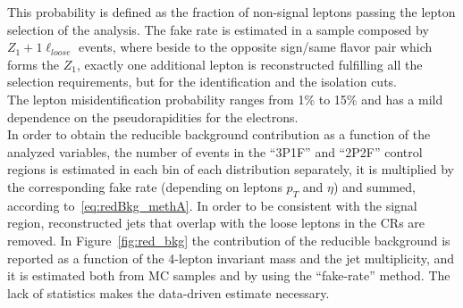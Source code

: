 This probability is defined as the fraction of non-signal leptons passing the lepton selection of the analysis.
The fake rate is estimated in a sample composed by $Z_1 + 1\ell _{loose}$ events, 
where beside to the opposite sign/same flavor pair which forms the $Z_{1}$, 
exactly one additional lepton is reconstructed fulfilling all the selection requirements, 
but for the identification and the isolation cuts.\\
The lepton misidentification probability ranges from 1\% to 15\% and has a mild dependence on the pseudorapidities for the 
electrons.\\
In order to obtain the reducible background contribution as a function of the analyzed variables, the number of events in the ``3P1F'' and  ``2P2F'' 
control regions is estimated in each bin of each distribution separately, it is multiplied by the corresponding fake rate (depending on leptons $p_T$ and $\eta$) and summed, according to~\ref{eq:redBkg_methA}. In order to be consistent with the signal region, reconstructed jets that overlap with the loose leptons in the CRs are removed. In Figure~\ref{fig:red_bkg} the contribution of the reducible background is reported as a function of the 4-lepton invariant mass and the jet multiplicity, and it is estimated both from MC samples and by 
using the ``fake-rate'' method. The lack of statistics makes the data-driven estimate necessary.

